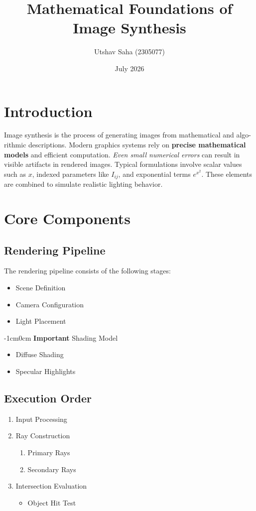 \documentclass{article}
\title{Mathematical Foundations of Image Synthesis}
\author{Utshav Saha (2305077)}
\date{July 2026}
\begin{document}
\maketitle

\section{Introduction}
Image synthesis is the process of generating images from mathematical and algo-rithmic descriptions. Modern graphics systems rely on \textbf{precise mathematical models} and efficient computation. \emph{Even small numerical errors} can result in visible artifacts in rendered images. Typical formulations involve scalar values such as $x$, indexed parameters
like $I_{ij}$, and exponential terms $e^{x^2}$. These elements are combined to simulate realistic lighting behavior.

\section{Core Components}
\subsection{Rendering Pipeline}
The rendering pipeline consists of the following stages:

\begin{itemize}
    \item Scene Definition
    \item Camera Configuration
    \item[-] Light Placement
\end{itemize}

\begin{changemargin}{-1cm}{0cm} 
\textbf{Important} Shading Model\end{changemargin}
\begin{itemize}
    \item[-] Diffuse Shading
    \item[-] Specular Highlights
\end{itemize}

\subsection{Execution Order}
\begin{enumerate}
    \item Input Processing
    \item Ray Construction
        \begin{enumerate}
            \item Primary Rays
            \item Secondary Rays
        \end{enumerate}
    \item Intersection Evaluation
        \begin{itemize}
            \item Object Hit Test
        \end{itemize}
\end{enumerate}
\end{document}
